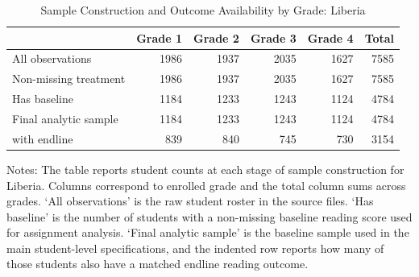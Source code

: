 \begin{table}[htbp]
\caption{Sample Construction and Outcome Availability by Grade: Liberia}
\label{tab:lib_sampleflow}
\begin{center}
\begin{small}
\begin{threeparttable}
\begin{tabular}{l*{5}{r}}
\toprule
 & Grade 1 & Grade 2 & Grade 3 & Grade 4 & Total \\
\midrule
All observations & 1986 & 1937 & 2035 & 1627 & 7585 \\
Non-missing treatment & 1986 & 1937 & 2035 & 1627 & 7585 \\
Has baseline & 1184 & 1233 & 1243 & 1124 & 4784 \\
Final analytic sample & 1184 & 1233 & 1243 & 1124 & 4784 \\
\quad with endline & 839 & 840 & 745 & 730 & 3154 \\
\bottomrule
\end{tabular}
\begin{tablenotes}
\footnotesize \item Notes: The table reports student counts at each stage of sample construction for Liberia. Columns correspond to enrolled grade and the total column sums across grades. `All observations' is the raw student roster in the source files. `Has baseline' is the number of students with a non-missing baseline reading score used for assignment analysis. `Final analytic sample' is the baseline sample used in the main student-level specifications, and the indented row reports how many of those students also have a matched endline reading outcome.
\end{tablenotes}
\end{threeparttable}
\end{small}
\end{center}
\end{table}